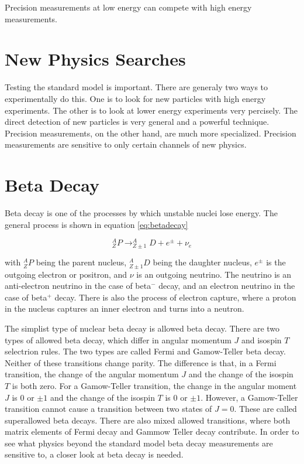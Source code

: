 \documentclass[main.tex]{subfiles}
\begin{document}
Precision measurements at low energy can compete with high energy measurements.

\section{New Physics Searches}
Testing the standard model is important.
There are generaly two ways to experimentally do this.
One is to look for new particles with high energy experiments. 
The other is to look at lower energy experiments very percisely.
The direct detection of new particles is very general and a powerful technique.
Precision measurements, on the other hand, are much more specialized.
Precision measurements are sensitive to only certain channels of new physics.

\section{Beta Decay}
Beta decay is one of the processes by which unstable nuclei lose energy.
The general process is shown in equation \ref{eq:betadecay}

\begin{equation}
	\label{eq:betadecay}
	^{A}_{Z}P \rightarrow ^{A}_{Z\pm 1}D + e^{\pm} + \nu_{e}
\end{equation}

with $^{A}_{Z}P$ being the parent nucleus, $^{A}_{Z \pm 1}D$ being the daughter nucleus, $e^{\pm}$ is the outgoing electron or positron, and $\nu$ is an outgoing neutrino.
The neutrino is an anti-electron neutrino in the case of beta$^{-}$ decay, and an electron neutrino in the case of beta$^{+}$ decay. 
There is also the process of electron capture, where a proton in the nucleus captures an inner electron and turns into a neutron.

The simplist type of nuclear beta decay is allowed beta decay.
There are two types of allowed beta decay, which differ in angular momentum $J$ and isospin $T$ selectrion rules.
The two types are called Fermi and Gamow-Teller beta decay. 
Neither of these transitions change parity.
The difference is that, in a Fermi transition, the change of the angular momentum $J$ and the change of the isospin $T$ is both zero.
For a Gamow-Teller transition, the change in the angular moment $J$ is $0$ or $\pm1$ and the change of the isospin $T$ is $0$ or $\pm 1$.
However, a Gamow-Teller transition cannot cause a transition between two states of $J = 0$. 
These are called superallowed beta decays.
There are also mixed allowed transitions, where both matrix elements of Fermi decay and Gammow Teller decay contribute.
In order to see what physics beyond the standard model beta decay measurements are sensitive to, a closer look at beta decay is needed.
\end{document}
